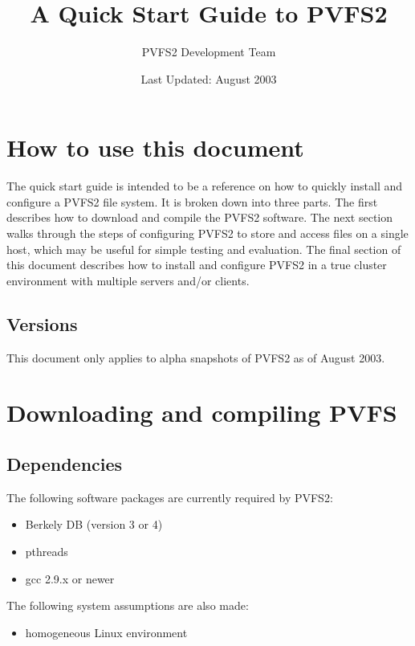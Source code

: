 \documentclass[11pt, letterpaper]{article}
\title{A Quick Start Guide to PVFS2}
\author{ PVFS2 Development Team }
\date{ Last Updated: August 2003 }
\begin{document}
\maketitle

\tableofcontents

\newpage

\thispagestyle{empty}

\setlength{\parindent}{0.0cm}

\section{How to use this document}
\label{sec:howto}

The quick start guide is intended to be a reference on how to quickly
install and configure a PVFS2 file system.  It is broken down into 
three parts.  The first
describes how to download and compile the PVFS2 software.  The next
section walks through the steps of configuring PVFS2 to store and
access files on a single host, which may be useful for simple testing
and evaluation.  The final section of this document describes how to
install and configure PVFS2 in a true cluster environment with multiple
servers and/or clients.

\subsection{Versions}

This document only applies to alpha snapshots of PVFS2 as of August 2003.

\section{Downloading and compiling PVFS}

\subsection{Dependencies}

The following software packages are currently required by PVFS2:
\begin{itemize}
\item Berkely DB (version 3 or 4)
\item pthreads
\item gcc 2.9.x or newer
\end{itemize}

The following system assumptions are also made:
\begin{itemize}
\item homogeneous Linux environment
\end{itemize}
\end{document}
